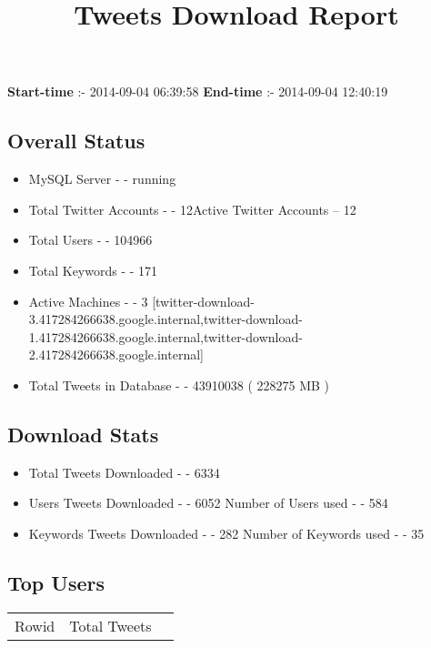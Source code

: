 \documentclass{article}\usepackage[T1]{fontenc}
\begin{document}
\title{\textbf{Tweets Download Report}}
               \date{}
                \maketitle
               \centerline{\textbf{Start-time} :- 2014-09-04 06:39:58 \hspace{40pt} \textbf{End-time} :- 2014-09-04 12:40:19}               \subsection*{Overall Status}                \begin{itemize}                \item MySQL Server - - running               \item Total Twitter Accounts - - 12\newline Active Twitter Accounts -- 12               \item Total Users - - 104966               \item Total Keywords - - 171               \item Active Machines - - 3 [twitter-download-3.417284266638.google.internal,twitter-download-1.417284266638.google.internal,twitter-download-2.417284266638.google.internal]               \item Total Tweets in Database - - 43910038 ( 228275 MB )               \end{itemize}               \subsection*{Download Stats}                \begin{itemize}                \item Total Tweets Downloaded - - 6334               \item Users Tweets Downloaded - - 6052 \newline Number of Users used - - 584               \item Keywords Tweets Downloaded - - 282 \newline Number of Keywords used - - 35              \end{itemize}              \subsection*{Top Users}\begin{tabular}{|c|c|c|}         \hline         Rowid & Total Tweets \\ 

\end{tabular}
\end{document}
